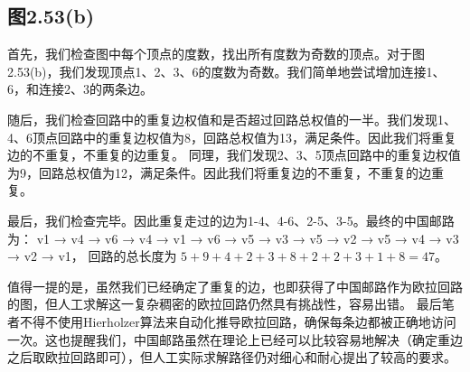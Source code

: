 \documentclass[utf8]{ctexart}
\theoremstyle{mystyle}
\begin{document}
\subsection*{图2.53(b)}
首先，我们检查图中每个顶点的度数，找出所有度数为奇数的顶点。对于图2.53(b)，我们发现顶点1、2、3、6的度数为奇数。我们简单地尝试增加连接1、6，和连接2、3的两条边。

随后，我们检查回路中的重复边权值和是否超过回路总权值的一半。我们发现1、4、6顶点回路中的重复边权值为8，回路总权值为13，满足条件。因此我们将重复边的不重复，不重复的边重复。
同理，我们发现2、3、5顶点回路中的重复边权值为9，回路总权值为12，满足条件。因此我们将重复边的不重复，不重复的边重复。

最后，我们检查完毕。因此重复走过的边为1-4、4-6、2-5、3-5。最终的中国邮路为： v1 → v4 → v6 → v4 → v1 → v6 → v5 → v3 → v5 → v2 → v5 → v4 → v3 → v2 → v1，
回路的总长度为 $ 5 + 9 + 4 + 2 + 3 + 8 + 2 + 2 + 3 + 1 + 8 = 47 $。

值得一提的是，虽然我们已经确定了重复的边，也即获得了中国邮路作为欧拉回路的图，但人工求解这一复杂稠密的欧拉回路仍然具有挑战性，容易出错。
最后笔者不得不使用Hierholzer算法来自动化推导欧拉回路，确保每条边都被正确地访问一次。这也提醒我们，中国邮路虽然在理论上已经可以比较容易地解决（确定重边之后取欧拉回路即可），但人工实际求解路径仍对细心和耐心提出了较高的要求。
\end{document}
